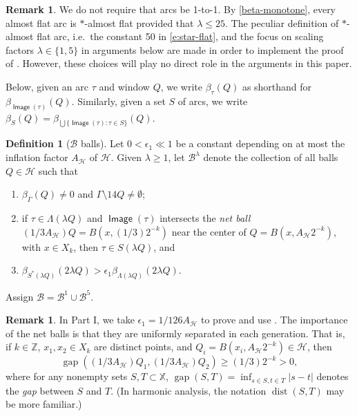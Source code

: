 \documentclass[12pt]{amsart}
\numberwithin{equation}{section}
\theoremstyle{plain}
\theoremstyle{definition}
\newtheorem{remark}[theorem]{Remark}
\newtheorem{definition}[theorem]{Definition}
\def\ZZ{\mathbb{Z}}
\def\XX{{\mathbb{X}}}
\newcommand{\dist}{\mathop\mathrm{dist}\nolimits}
\newcommand{\Image}{\mathop\mathsf{Image}\nolimits}
\newcommand{\gap}{\mathop\mathrm{gap}\nolimits}
\numberwithin{figure}{section}
\begin{document}
\begin{remark}We do not require that arcs be 1-to-1. By \eqref{beta-monotone}, every almost flat arc is $*$-almost flat provided that $\lambda \leq 25$. The peculiar definition of $*$-almost flat arc, i.e.~the constant 50 in \eqref{e:star-flat}, and the focus on scaling factors $\lambda\in\{1,5\}$ in arguments below are made in order to implement the proof of \cite[Lemma 3.29]{Badger-McCurdy-1}. However, these choices will play no direct role in the arguments in this paper.\end{remark}

Below, given an arc $\tau$ and window $Q$, we write $\beta_\tau(Q)$ as shorthand for $\beta_{\Image(\tau)}(Q)$. Similarly, given a set $S$ of arcs, we write $\beta_S(Q)=\beta_{\bigcup\{\Image(\tau):\tau\in S\}}(Q)$.

\begin{definition}[$\mathscr{B}$ balls] \label{B-balls-def} Let $0<\epsilon_1\ll 1$ be a constant depending on at most the inflation factor $A_\mathscr{H}$ of $\mathscr{H}$. Given $\lambda\geq 1$, let $\mathscr{B}^\lambda$ denote the collection of all balls $Q\in\mathscr{H}$ such that \begin{enumerate}
\item[(i)] $\beta_{\Gamma}(Q)\neq 0$ and $\Gamma\setminus 14 Q\neq\emptyset$;
\item[(ii)] if $\tau\in\Lambda(\lambda Q)$ and $\Image(\tau)$ intersects the \emph{net ball} $(1/3A_{\mathscr{H}})Q=B(x,(1/3)2^{-k})$ near the center of $Q=B(x,A_\mathscr{H}2^{-k})$, with $x\in X_k$, then $\tau\in S(\lambda Q)$, and \label{netball}
\item[(iii)] $\beta_{S^*(\lambda Q)}(2\lambda Q) > \epsilon_1 \beta_{\Lambda(\lambda Q)}(2\lambda Q)$.
\end{enumerate}Assign $\mathscr{B}=\mathscr{B}^1\cup\mathscr{B}^5$.\end{definition}

\begin{remark} In Part I, we take $\epsilon_1=1/126A_\mathscr{H}$ to prove and use \cite[Lemma 3.29]{Badger-McCurdy-1}. The importance of the net balls is that they are uniformly separated in each generation. That is, if $k\in\ZZ$, $x_1,x_2\in X_k$ are distinct points, and $Q_i=B(x_i,A_\mathscr{H}2^{-k})\in\mathscr{H}$, then \begin{equation}\label{net-gap} \gap((1/3A_\mathscr{H})Q_1,(1/3A_\mathscr{H})Q_2)\geq (1/3) 2^{-k}>0,\end{equation} where for any nonempty sets $S,T\subset\XX$, $\gap(S,T)=\inf_{s\in S, t\in T}|s-t|$ denotes the \emph{gap} between $S$ and $T$. (In harmonic analysis, the notation $\dist(S,T)$ may be more familiar.)\end{remark}
\end{document}
